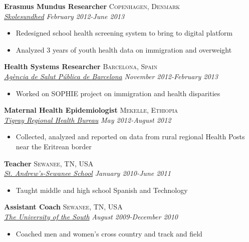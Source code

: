 \documentclass[11pt]{article}
\begin{document}
\noindent \textbf{Erasmus Mundus Researcher} \hfill \textsc{Copenhagen, Denmark}\\
\noindent \emph{\href{https://www.skolesundhed.dk/Default.aspx}{Skolesundhed}} \hfill \emph{February 2012-June 2013}
\vspace{-2mm}
\begin{itemize}\itemsep0pt \parskip0pt 
\item Redesigned school health screening system to bring to digital platform 
\item Analyzed 3 years of youth health data on immigration and overweight
\end{itemize}

\noindent \textbf{Health Systems Researcher} \hfill \textsc{Barcelona, Spain}\\
\noindent \emph{\href{http://www.aspb.cat/}{Agència de Salut Pública de Barcelona}} \hfill \emph{November 2012-February 2013}
\vspace{-2mm}
\begin{itemize}\itemsep0pt \parskip0pt 
\item Worked on SOPHIE project on immigration and health disparities 
\end{itemize}

\noindent \textbf{Maternal Health Epidemiologist} \hfill \textsc{Mekelle, Ethiopia}\\
\noindent \emph{\href{http://www.moh.gov.et/tigrayhb}{Tigray Regional Health Bureau}} \hfill \emph{May 2012-August 2012}
\vspace{-2mm}
\begin{itemize}\itemsep0pt \parskip0pt 
\item Collected, analyzed and reported on data from rural regional Health Posts near the Eritrean border
\end{itemize}

\noindent \textbf{Teacher} \hfill \textsc{Sewanee, TN, USA}\\
\noindent \emph{\href{http://www.sasweb.org/}{St. Andrew's-Sewanee School}} \hfill \emph{January 2010-June 2011}
\vspace{-2mm}
\begin{itemize}\itemsep0pt \parskip0pt 
\item Taught middle and high school Spanish and Technology
\end{itemize}

\noindent \textbf{Assistant Coach} \hfill \textsc{Sewanee, TN, USA}\\
\noindent \emph{\href{http://sewanee.edu/}{The University of the South}} \hfill \emph{August 2009-December 2010}
\vspace{-2mm}
\begin{itemize}\itemsep0pt \parskip0pt 
\item Coached men and women's cross country and track and field
\end{itemize}
\end{document}
